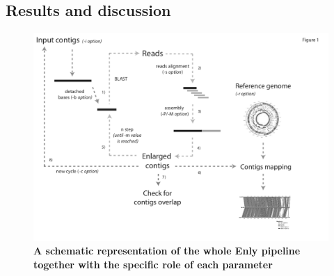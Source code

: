 \subsection{Results and discussion}
\begin{figure}[!tb]
	\center
    \includegraphics[width=1\textwidth]{figures/appendix/thesis_36}
	\caption{\label{fig:enly}\textbf{A schematic representation of the whole Enly pipeline together with the specific role of each parameter}}
\end{figure}

